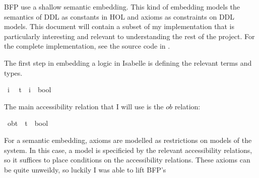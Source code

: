\begin{isabellebody}
\begin{isamarkuptext}
BFP use a shallow semantic embedding. This kind of embedding models the semantics of DDL as 
constants in HOL and axioms as constraints on DDL models. This document will contain a subset of my 
implementation that is particularly interesting and relevant to understanding the rest of the project. 
For the complete implementation, see the source code in .%
\end{isamarkuptext}\isamarkuptrue%
%
\isadelimdocument
%
\endisadelimdocument
%
\isatagdocument
%
\isamarkuptrue%
%
\endisatagdocument
{\isafolddocument}%
%
\isadelimdocument
%
\endisadelimdocument
%
\begin{isamarkuptext}%
The first step in embedding a logic in Isabelle is defining the relevant terms and types.%
\end{isamarkuptext}\isamarkuptrue%
\isamarkupfalse%
\ i\ %
\isanewline
\isanewline
{}\isamarkupfalse%
\ t\ {\isacharequal}\ {\isachardoublequoteopen}{\isacharparenleft}i\ {\isasymRightarrow}\ bool{\isacharparenright}{\isachardoublequoteclose}\ %
\isanewline
%
\isanewline
%
\begin{isamarkuptext}%
The main accessibility relation that I will use is the $ob$ relation:%
\end{isamarkuptext}\isamarkuptrue%
\isamarkupfalse%
\ ob{\isacharcolon}{\isacharcolon}{\isachardoublequoteopen}t\ {\isasymRightarrow}\ {\isacharparenleft}t\ {\isasymRightarrow}\ bool{\isacharparenright}{\isachardoublequoteclose}\ \ %
\isanewline
\ %
\isanewline
%
\isadelimdocument
%
\endisadelimdocument
%
\isatagdocument
%
\isamarkuptrue%
%
\endisatagdocument
{\isafolddocument}%
%
\isadelimdocument
%
\endisadelimdocument
%
\begin{isamarkuptext}%
For a semantic embedding, axioms are modelled as restrictions on models of the system. In this case,
a model is specificied by the relevant accessibility relations, so it suffices to place conditions on 
the accessibility relations. These axioms can be quite unweildy, so luckily I was able to lift BFP's \cite{BFP}

\end{isamarkuptext}
\end{isabellebody}
